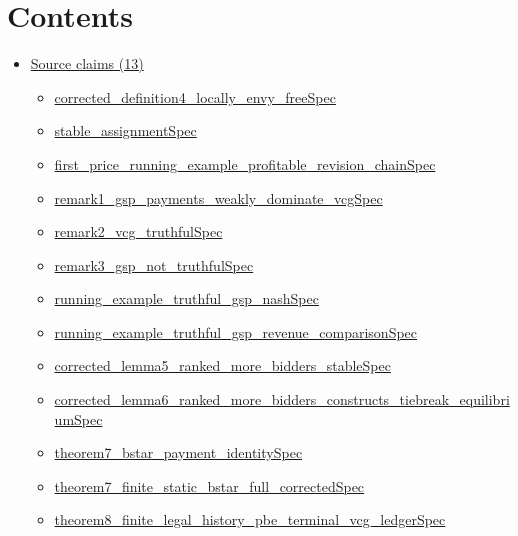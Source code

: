 \documentclass[10pt]{article}
\begin{document}
\section*{Contents}
\begin{itemize}[leftmargin=1.2em]
\item \hyperlink{source-section-f10b5f68e4acf3dc}{Source claims (13)}
\begin{itemize}[leftmargin=1.2em]
\item \hyperlink{source-claim-0fae21de00569e3c}{corrected\_\allowbreak{}definition4\_\allowbreak{}locally\_\allowbreak{}envy\_\allowbreak{}free\allowbreak{}Spec}
\item \hyperlink{source-claim-ce8f50923b43bde9}{stable\_\allowbreak{}assignment\allowbreak{}Spec}
\item \hyperlink{source-claim-5f5dbcc78d92e09e}{first\_\allowbreak{}price\_\allowbreak{}running\_\allowbreak{}example\_\allowbreak{}profitable\_\allowbreak{}revision\_\allowbreak{}chain\allowbreak{}Spec}
\item \hyperlink{source-claim-356b8731e456c635}{remark1\_\allowbreak{}gsp\_\allowbreak{}payments\_\allowbreak{}weakly\_\allowbreak{}dominate\_\allowbreak{}vcg\allowbreak{}Spec}
\item \hyperlink{source-claim-912ce3e72e5aabde}{remark2\_\allowbreak{}vcg\_\allowbreak{}truthful\allowbreak{}Spec}
\item \hyperlink{source-claim-1951070cd567204e}{remark3\_\allowbreak{}gsp\_\allowbreak{}not\_\allowbreak{}truthful\allowbreak{}Spec}
\item \hyperlink{source-claim-5798ec623309f406}{running\_\allowbreak{}example\_\allowbreak{}truthful\_\allowbreak{}gsp\_\allowbreak{}nash\allowbreak{}Spec}
\item \hyperlink{source-claim-110a524c6dbd4f91}{running\_\allowbreak{}example\_\allowbreak{}truthful\_\allowbreak{}gsp\_\allowbreak{}revenue\_\allowbreak{}comparison\allowbreak{}Spec}
\item \hyperlink{source-claim-a50c255540689cf3}{corrected\_\allowbreak{}lemma5\_\allowbreak{}ranked\_\allowbreak{}more\_\allowbreak{}bidders\_\allowbreak{}stable\allowbreak{}Spec}
\item \hyperlink{source-claim-f495e2be93092237}{corrected\_\allowbreak{}lemma6\_\allowbreak{}ranked\_\allowbreak{}more\_\allowbreak{}bidders\_\allowbreak{}constructs\_\allowbreak{}tiebreak\_\allowbreak{}equilibrium\allowbreak{}Spec}
\item \hyperlink{source-claim-c52506a4136e9a4c}{theorem7\_\allowbreak{}bstar\_\allowbreak{}payment\_\allowbreak{}identity\allowbreak{}Spec}
\item \hyperlink{source-claim-4fc8a2389d1aac9f}{theorem7\_\allowbreak{}finite\_\allowbreak{}static\_\allowbreak{}bstar\_\allowbreak{}full\_\allowbreak{}corrected\allowbreak{}Spec}
\item \hyperlink{source-claim-9e64bb65c7fb62ab}{theorem8\_\allowbreak{}finite\_\allowbreak{}legal\_\allowbreak{}history\_\allowbreak{}pbe\_\allowbreak{}terminal\_\allowbreak{}vcg\_\allowbreak{}ledger\allowbreak{}Spec}
\end{itemize}
\end{itemize}
\end{document}
